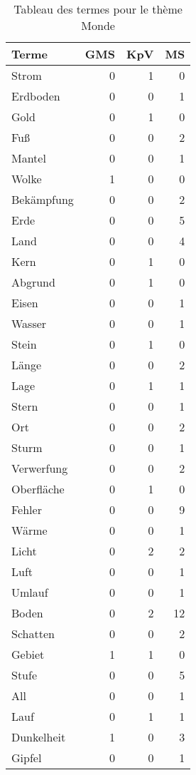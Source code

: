 
\begin{table}[ht]
\centering
\caption{Tableau des termes pour le thème Monde}
\label{tab:Monde}
\begin{tabular}{lrrr}
\hline
 Terme      &   GMS &   KpV &   MS \\
\hline
 Strom      &     0 &     1 &    0 \\
 Erdboden   &     0 &     0 &    1 \\
 Gold       &     0 &     1 &    0 \\
 Fuß        &     0 &     0 &    2 \\
 Mantel     &     0 &     0 &    1 \\
 Wolke      &     1 &     0 &    0 \\
 Bekämpfung &     0 &     0 &    2 \\
 Erde       &     0 &     0 &    5 \\
 Land       &     0 &     0 &    4 \\
 Kern       &     0 &     1 &    0 \\
 Abgrund    &     0 &     1 &    0 \\
 Eisen      &     0 &     0 &    1 \\
 Wasser     &     0 &     0 &    1 \\
 Stein      &     0 &     1 &    0 \\
 Länge      &     0 &     0 &    2 \\
 Lage       &     0 &     1 &    1 \\
 Stern      &     0 &     0 &    1 \\
 Ort        &     0 &     0 &    2 \\
 Sturm      &     0 &     0 &    1 \\
 Verwerfung &     0 &     0 &    2 \\
 Oberfläche &     0 &     1 &    0 \\
 Fehler     &     0 &     0 &    9 \\
 Wärme      &     0 &     0 &    1 \\
 Licht      &     0 &     2 &    2 \\
 Luft       &     0 &     0 &    1 \\
 Umlauf     &     0 &     0 &    1 \\
 Boden      &     0 &     2 &   12 \\
 Schatten   &     0 &     0 &    2 \\
 Gebiet     &     1 &     1 &    0 \\
 Stufe      &     0 &     0 &    5 \\
 All        &     0 &     0 &    1 \\
 Lauf       &     0 &     1 &    1 \\
 Dunkelheit &     1 &     0 &    3 \\
 Gipfel     &     0 &     0 &    1 \\
\hline
\end{tabular}
\end{table}
    